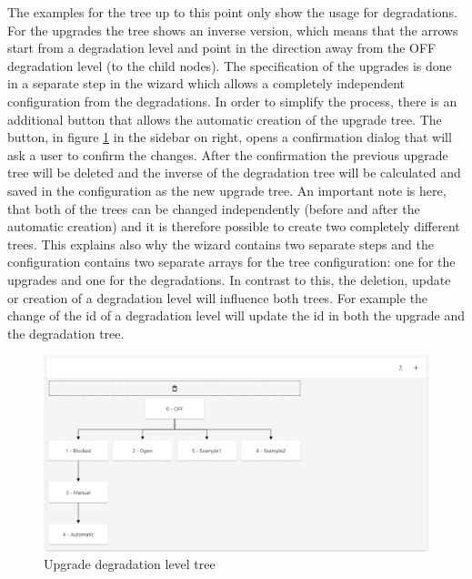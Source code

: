 The examples for the tree up to this point only show the usage for degradations. For the upgrades the tree shows an inverse version, which means that the arrows start from a degradation level and point in the direction away from the OFF degradation level (to the child nodes). The specification of the upgrades is done in a separate step in the wizard which allows a completely independent configuration from the degradations. In order to simplify the process, there is an additional button that allows the automatic creation of the upgrade tree. The button, in figure \ref{fig:upgrade_level_tree_drop} in the sidebar on right, opens a confirmation dialog that will ask a user to confirm the changes. After the confirmation the previous upgrade tree will be deleted and the inverse of the degradation tree will be calculated and saved in the configuration as the new upgrade tree. An important note is here, that both of the trees can be changed independently (before and after the automatic creation) and it is therefore possible to create two completely different trees. This explains also why the wizard contains two separate steps and the configuration contains two separate arrays for the tree configuration: one for the upgrades and one for the degradations. In contrast to this, the deletion, update or creation of a degradation level will influence both trees. For example the change of the id of a degradation level will update the id in both the upgrade and the degradation tree.

\begin{figure}[ht]
    \centering
    \includegraphics[width=\textwidth]{img/upgrade_tree.png}
    \caption{Upgrade degradation level tree}
    \label{fig:upgrade_level_tree_drop}
\end{figure}

